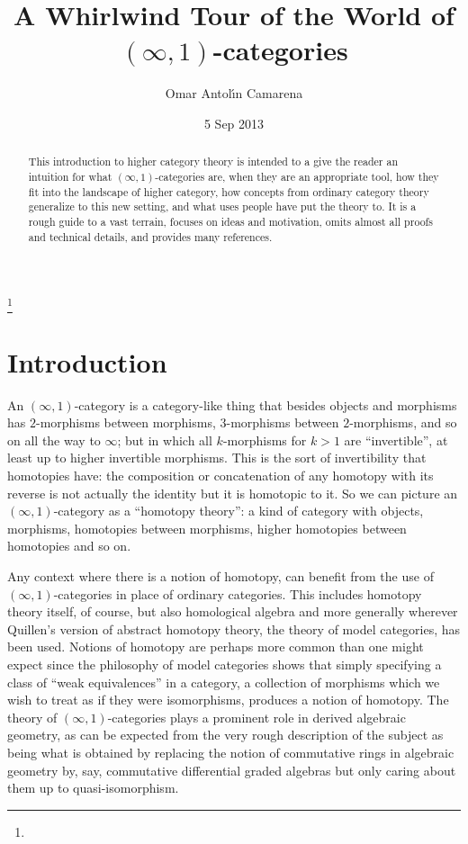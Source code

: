\documentclass[12pt]{amsart}
\theoremstyle{definition} \newtheorem{definition}[theorem]{Definition}
\numberwithin{equation}{section}
\newcommand{\oo}{\infty}
\newcommand{\io}{$(\oo,1)$}
\begin{document}
\title[Whirlwind Tour of $(\infty,1)$-categories]{A Whirlwind Tour of
the World of $(\infty,1)$-categories}

\author{Omar Antol\'{\i}n Camarena} \address{} \curraddr{}
 \thanks{}


\date{5 Sep 2013}

\begin{abstract}
  This introduction to higher category theory is intended to a give
  the reader an intuition for what \io-categories are, when they are
  an appropriate tool, how they fit into the landscape of higher
  category, how concepts from ordinary category theory generalize to
  this new setting, and what uses people have put the theory to. It is
  a rough guide to a vast terrain, focuses on ideas and motivation,
  omits almost all proofs and technical details, and provides many
  references.
\end{abstract}

\maketitle

\section{Introduction}

An \io-category is a category-like thing that besides objects and
morphisms has $2$-morphisms between morphisms, $3$-morphisms between
$2$-morphisms, and so on all the way to $\oo$; but in which all
$k$-morphisms for $k>1$ are ``invertible'', at least up to higher
invertible morphisms. This is the sort of invertibility that
homotopies have: the composition or concatenation of any homotopy with
its reverse is not actually the identity but it is homotopic to it. So
we can picture an \io-category as a ``homotopy theory'': a kind of
category with objects, morphisms, homotopies between morphisms, higher
homotopies between homotopies and so on.

Any context where there is a notion of homotopy, can benefit from the
use of \io-categories in place of ordinary categories. This includes
homotopy theory itself, of course, but also homological algebra and
more generally wherever Quillen's version of abstract homotopy theory,
the theory of model categories, has been used. Notions of homotopy are
perhaps more common than one might expect since the philosophy of
model categories shows that simply specifying a class of ``weak
equivalences'' in a category, a collection of morphisms which we wish
to treat as if they were isomorphisms, produces a notion of homotopy.
The theory of \io-categories plays a prominent role in derived
algebraic geometry, as can be expected from the very rough description
of the subject as being what is obtained by replacing the notion of
commutative rings in algebraic geometry by, say, commutative
differential graded algebras but only caring about them up to
quasi-isomorphism.
\end{document}
